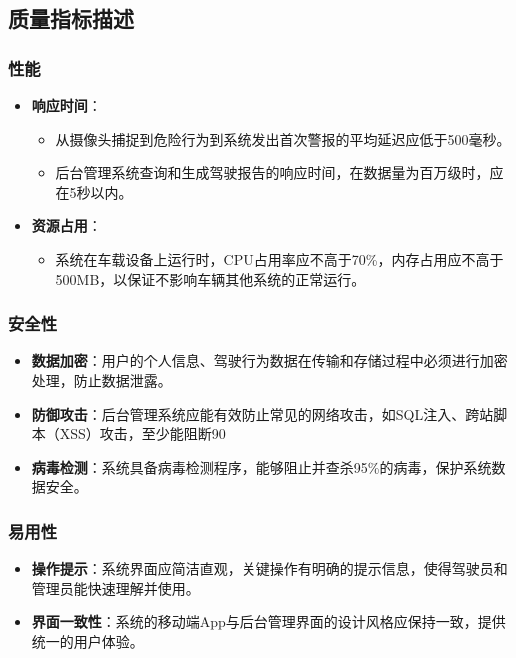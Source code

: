 \documentclass[a4paper,12pt]{article}
\begin{document}
\subsection{质量指标描述}

\subsubsection{性能}
\begin{itemize}
    \item \textbf{响应时间}：
    \begin{itemize}
        \item 从摄像头捕捉到危险行为到系统发出首次警报的平均延迟应低于500毫秒。
        \item 后台管理系统查询和生成驾驶报告的响应时间，在数据量为百万级时，应在5秒以内。
    \end{itemize}
    \item \textbf{资源占用}：
    \begin{itemize}
        \item 系统在车载设备上运行时，CPU占用率应不高于70\%，内存占用应不高于500MB，以保证不影响车辆其他系统的正常运行。
    \end{itemize}
\end{itemize}

\subsubsection{安全性}
\begin{itemize}
    \item \textbf{数据加密}：用户的个人信息、驾驶行为数据在传输和存储过程中必须进行加密处理，防止数据泄露。
    \item \textbf{防御攻击}：后台管理系统应能有效防止常见的网络攻击，如SQL注入、跨站脚本（XSS）攻击，至少能阻断90%
    \item \textbf{病毒检测}：系统具备病毒检测程序，能够阻止并查杀95\%的病毒，保护系统数据安全。
\end{itemize}

\subsubsection{易用性}
\begin{itemize}
    \item \textbf{操作提示}：系统界面应简洁直观，关键操作有明确的提示信息，使得驾驶员和管理员能快速理解并使用。
    \item \textbf{界面一致性}：系统的移动端App与后台管理界面的设计风格应保持一致，提供统一的用户体验。
\end{itemize}
\end{document}
